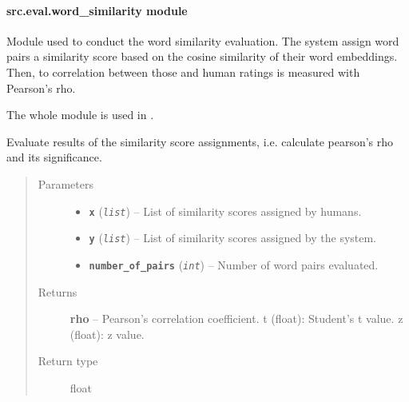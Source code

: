 \documentclass[letterpaper,10pt,english]{sphinxmanual}
\begin{document}
\paragraph{src.eval.word\_similarity module}
\label{src.eval:src-eval-word-similarity-module}\label{src.eval:module-src.eval.word_similarity}
Module used to conduct the word similarity evaluation. The system assign word pairs a similarity score based on
the cosine similarity of their word embeddings. Then, to correlation between those and human ratings is measured with
Pearson's rho.

The whole module is used in .

\begin{fulllineitems}
\label{src.eval:src.eval.word_similarity.evaluate_wordpair_sims}
Evaluate results of the similarity score assignments, i.e. calculate pearson's rho and its significance.
\begin{quote}\begin{description}
\item[{Parameters}] \leavevmode\begin{itemize}
\item {} 
\textbf{\texttt{x}} (\emph{\texttt{list}}) -- List of similarity scores assigned by humans.

\item {} 
\textbf{\texttt{y}} (\emph{\texttt{list}}) -- List of similarity scores assigned by the system.

\item {} 
\textbf{\texttt{number\_of\_pairs}} (\emph{\texttt{int}}) -- Number of word pairs evaluated.

\end{itemize}

\item[{Returns}] \leavevmode
\textbf{rho} -- Pearson's correlation coefficient.
t (float): Student's t value.
z (float): z value.

\item[{Return type}] \leavevmode
float

\end{description}\end{quote}

\end{fulllineitems}
\end{document}
